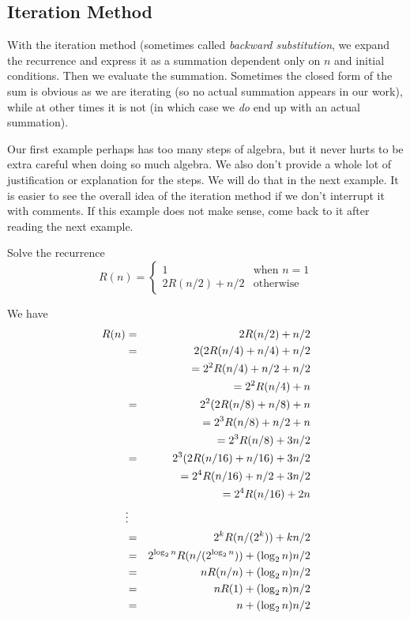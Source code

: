 \subsection{Iteration Method} 

With the iteration method (sometimes called {\em backward substitution}, 
we expand the recurrence and express
it as a summation dependent only on $n$ and initial conditions.
Then we evaluate the summation.
Sometimes the closed form of the sum is obvious as we are iterating
(so no actual summation appears in our work), while at other times
it is not (in which case we {\em do} end up with an actual summation).

Our first example perhaps has too many steps of algebra, but it never
hurts to be extra careful when doing so much algebra.
We also don't provide a whole lot of justification or explanation for
the steps.  We will do that in the next example.  It is easier to see
the overall idea of the iteration method if we don't interrupt it
with comments.  If this example does not make sense, come back to it
after reading the next example.

\begin{exa}\label{exa:R}
Solve the recurrence 
$$
R(n) = \left\{ 
\begin{array}{ll}
1&\mbox{when $n = 1$}\\
2 R(n/2) + n/2 & \mbox{otherwise}
\end{array}
\right.
$$
\begin{pf}
We have
\begin{eqnarray*}
R(n)&=&2 R(n/2) + n/2\\
&=&2(2 R(n/4) + n/4 ) + n/2\\
&&=2^2R(n/4) + n/2+n/2\\
&&= 2^2R(n/4) + n\\
&=&2^2(2 R(n/8) + n/8 ) + n\\
&&=  2^3R(n/8) + n/2+n\\
&&=  2^3R(n/8) + 3n/2\\
&=&2^3(2 R(n/16) + n/16 ) + 3n/2\\
&&=2^4R(n/16) + n/2 + 3n/2\\
&&=2^4R(n/16) + 2n\\
&\hfill\vdots\hfill\hfill\\
&=&2^k R(n/(2^k)) + k n/2\\
&=&2^{\log_2 n} R(n/(2^{\log_2 n})) + (\log_2 n) n/2\\
&=&n R(n/n) + (\log_2 n) n/2\\
&=&n R(1) + (\log_2 n) n/2\\
&=&n + (\log_2 n) n/2
\end{eqnarray*}
\end{pf}\end{exa}


